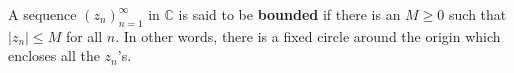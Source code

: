 A sequence $(z_n)_{n=1}^{\infty}$ in $\mathbb{C}$ is said to be \textbf{bounded} if there is an $M \geq 0$ such that $|z_n| \leq M$ for all $n$. In other words, there is a fixed circle around the origin which encloses all the $z_n$'s.
